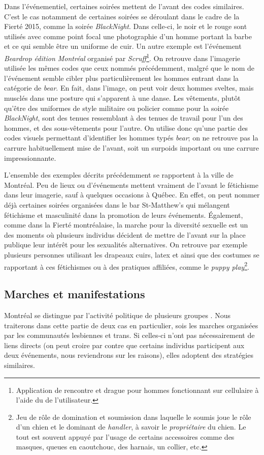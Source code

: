 Dans l'événementiel, certaines soirées mettent de l'avant des codes similaires.
C'est le cas notamment de certaines soirées se déroulant dans le cadre de la Fierté 2015, comme la soirée  \emph{BlackNight}.
Dans celle-ci, le noir et le rouge sont utilisés avec comme point focal une photographie d'un homme portant la barbe et ce qui semble être un uniforme de cuir.
Un autre exemple est l'événement \emph{Beardrop édition Montréal} organisé par \emph{Scruff}\footnote{Application de rencontre et drague pour hommes fonctionnant sur cellulaire à l'aide du \gps{} de l'utilisateur.}.
On retrouve dans l'imagerie utilisée les mêmes codes que ceux nommés précédemment, malgré que le nom de l'événement semble cibler plus particulièrement les hommes entrant dans la catégorie de \emph{bear}.
En fait, dans l'image, on peut voir deux hommes sveltes, mais musclés dans une posture qui s'apparent à une danse.
Les vêtements, plutôt qu'être des uniformes de style militaire ou policier comme pour la soirée \emph{BlackNight}, sont des tenues ressemblant à des tenues de travail pour l'un des hommes, et des sous-vêtements pour l'autre.
On utilise donc qu'une partie des codes visuels permettant d'identifier les hommes typés \emph{bear}; on ne retrouve pas la carrure habituellement mise de l'avant, soit un surpoids important ou une carrure impressionnante.

L'ensemble des exemples décrits précédemment se rapportent à la ville de Montréal.
Peu de lieux ou d'événements mettent vraiment de l'avant le fétichisme dans leur imagerie, sauf à quelques occasions à Québec.
En effet, on peut nommer déjà certaines soirées organisées dans le bar St-Matthew's qui mélangent fétichisme et masculinité dans la promotion de leurs événements.
Également, comme dans la Fierté montréalaise, la marche pour la diversité sexuelle est un des moments où plusieurs individus décident de mettre de l'avant sur la place publique leur intérêt pour les sexualités alternatives.
On retrouve par exemple plusieurs personnes utilisant les drapeaux cuirs, latex et \bdsm{} ainsi que des costumes se rapportant à ces fétichismes ou à des pratiques affiliées, comme le \emph{puppy play}\footnote{Jeu de rôle de domination et soumission dans laquelle le soumis joue le rôle d'un chien  et le dominant de \emph{handler}, à savoir le \emph{propriétaire} du chien. Le tout est souvent appuyé par l'usage de certains accessoires comme des masques, queues en caoutchouc, des harnais, un collier, etc.}.

\subsection{Marches et manifestations}
\label{subsec:label}
 Montréal se distingue par l'activité politique de plusieurs groupes \lgbt{}.
Nous traiterons dans cette partie de deux cas en particulier, sois les marches organisées par les communautés lesbiennes et trans. Si celles-ci n'ont pas nécessairement de liens directs (on peut croire par contre que certains individus participent aux deux événements, nous reviendrons sur les raisons), elles adoptent des stratégies similaires.

